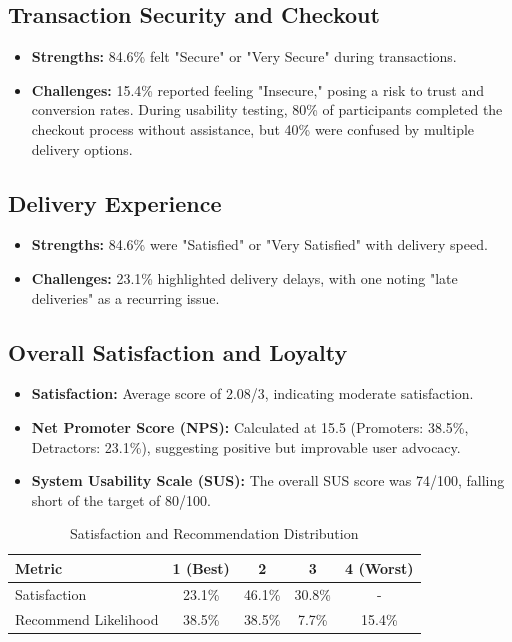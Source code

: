 \documentclass[conference]{IEEEtran}
\begin{document}
\subsection{Transaction Security and Checkout}
\begin{itemize}
    \item \textbf{Strengths:} 84.6\% felt "Secure" or "Very Secure" during transactions.
    \item \textbf{Challenges:} 15.4\% reported feeling "Insecure," posing a risk to trust and conversion rates. During usability testing, 80\% of participants completed the checkout process without assistance, but 40\% were confused by multiple delivery options.
\end{itemize}

\subsection{Delivery Experience}
\begin{itemize}
    \item \textbf{Strengths:} 84.6\% were "Satisfied" or "Very Satisfied" with delivery speed.
    \item \textbf{Challenges:} 23.1\% highlighted delivery delays, with one noting "late deliveries" as a recurring issue.
\end{itemize}

\subsection{Overall Satisfaction and Loyalty}
\begin{itemize}
    \item \textbf{Satisfaction:} Average score of 2.08/3, indicating moderate satisfaction.
    \item \textbf{Net Promoter Score (NPS):} Calculated at 15.5 (Promoters: 38.5\%, Detractors: 23.1\%), suggesting positive but improvable user advocacy.
    \item \textbf{System Usability Scale (SUS):} The overall SUS score was 74/100, falling short of the target of 80/100.
\end{itemize}

\begin{table}[!htbp]
\caption{Satisfaction and Recommendation Distribution}
\label{table:satisfaction}
\centering
\begin{tabular}{@{}lcccc@{}}
\toprule
\textbf{Metric} & \textbf{1 (Best)} & \textbf{2} & \textbf{3} & \textbf{4 (Worst)} \\
\midrule
Satisfaction & 23.1\% & 46.1\% & 30.8\% & - \\
Recommend Likelihood & 38.5\% & 38.5\% & 7.7\% & 15.4\% \\
\bottomrule
\end{tabular}
\end{table}
\end{document}
